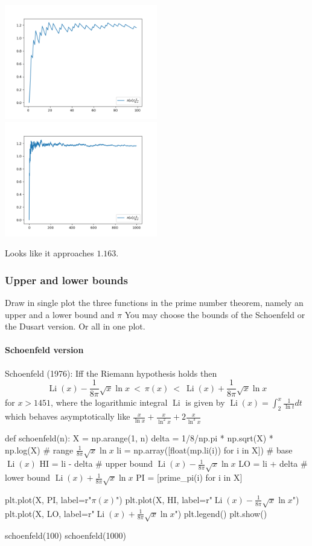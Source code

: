 \documentclass{article}
\newcommand{\Li}{\operatorname{Li}}
\begin{document}
  \noindent
  \includegraphics[width=0.5\textwidth]{div100}%
  \includegraphics[width=0.5\textwidth]{div1000}

  Looks like it approaches $1.163$.

  \subsubsection{Upper and lower bounds}
  \begin{centerframebox}
    Draw in single plot the three functions in the prime number theorem,
    namely an upper and a lower bound and $\pi$ You may choose the
    bounds of the Schoenfeld or the Dusart version. Or all in one plot.
  \end{centerframebox}
  \paragraph*{Schoenfeld version}
  \begin{centerframebox}
    Schoenfeld (1976): Iff the Riemann hypothesis holds then
    \[ \Li(x)-\frac{1}{8\pi}\sqrt{x}\ln x ~<~ \pi(x) ~<~ \Li(x)+\frac{1}{8\pi}\sqrt{x}\ln x \]
    for $x > 1451$, where the logarithmic integral $\Li$ is given by
    $\Li(x) = \int_2^x \frac{1}{\ln t} dt$ which behaves asymptotically like
    $\frac{x}{\ln x} + \frac{x}{\ln^2 x} + 2\frac{x}{\ln^3 x}$
  \end{centerframebox}
  \begin{mylisting}
    def schoenfeld(n):
      X = np.arange(1, n)
      delta = 1/8/np.pi * np.sqrt(X) * np.log(X) # range $\frac{1}{8\pi}\sqrt{x}\ln x$
      li = np.array([float(mp.li(i)) for i in X]) # base $\Li(x)$
      HI = li - delta # upper bound $\Li(x)-\frac{1}{8\pi}\sqrt{x}\ln x$
      LO = li + delta # lower bound $\Li(x)+\frac{1}{8\pi}\sqrt{x}\ln x$
      PI = [prime_pi(i) for i in X]

      plt.plot(X, PI, label=r"$\pi(x)$")
      plt.plot(X, HI, label=r"$\Li(x)-\frac{1}{8\pi}\sqrt{x}\ln x$")
      plt.plot(X, LO, label=r"$\Li(x)+\frac{1}{8\pi}\sqrt{x}\ln x$")
      plt.legend()
      plt.show()

    schoenfeld(100)
    schoenfeld(1000)
  \end{mylisting}
\end{document}
